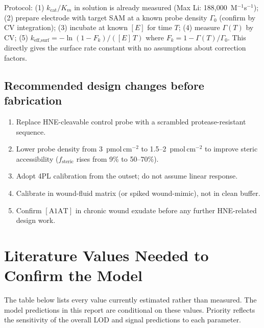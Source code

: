 \documentclass[10pt,a4paper]{article}
\begin{document}
Protocol: (1) $k_\text{cat}/K_m$ in solution is already measured (Max Li: 188,000~M$^{-1}$s$^{-1}$);
(2) prepare electrode with target SAM at a known probe density $\Gamma_0$ (confirm by CV
integration); (3) incubate at known $[E]$ for time $T$; (4) measure $\Gamma(T)$ by CV;
(5) $k_\text{eff,surf} = -\ln(1 - F_k) / ([E]\,T)$ where $F_k = 1 - \Gamma(T)/\Gamma_0$.
This directly gives the surface rate constant with no assumptions about correction factors.

\subsection{Recommended design changes before fabrication}

\begin{enumerate}[noitemsep]
\item Replace HNE-cleavable control probe with a scrambled protease-resistant sequence.
\item Lower probe density from 3~pmol\,cm$^{-2}$ to 1.5--2~pmol\,cm$^{-2}$ to improve
  steric accessibility ($f_\text{steric}$ rises from 9\% to 50--70\%).
\item Adopt 4PL calibration from the outset; do not assume linear response.
\item Calibrate in wound-fluid matrix (or spiked wound-mimic), not in clean buffer.
\item Confirm $[\text{A1AT}]$ in chronic wound exudate before any further HNE-related design work.
\end{enumerate}

\section{Literature Values Needed to Confirm the Model}
\label{sec:litgaps}

The table below lists every value currently estimated rather than measured. The model
predictions in this report are conditional on these values. Priority reflects the
sensitivity of the overall LOD and signal predictions to each parameter.
\end{document}
